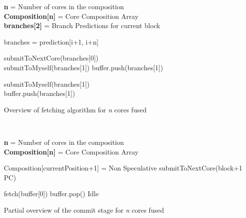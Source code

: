 \begin{algorithm}

\textbf{n} = Number of cores in the composition\\
\textbf{Composition[n]} = Core Composition Array\\
\textbf{branches[2]} = Branch Predictions for current block\\

{
branches = prediction[i+1, i+n]\\
{
	{
		submitToNextCore(branches[0])\\
		
		{
			submitToMyself(branches[1])
		}
		{
			buffer.push(branches[1])\\
		}
	}
	{
	{
		submitToMyself(branches[1])\\
	}
	{
		buffer.push(branches[1])\\
	}
	
	}
}
}
\caption{Overview of fetching algorithm for \textit{n} cores fused}~\label{alg:fetch}
\end{algorithm}

\begin{algorithm}
\textbf{n} = Number of cores in the composition\\
\textbf{Composition[n]} = Core Composition Array\\

{
	{
		Composition[currentPosition+1] = Non Speculative\;
	}
	{
		submitToNextCore(block+1 PC)
	}
	
	{
		fetch(buffer[0])
		buffer.pop()
	}
	\Else
	{
		Idle
	}
}
\vspace{-1em}
\caption{Partial overview of the commit stage for \textit{n} cores fused}~\label{alg:commit}
\end{algorithm}


